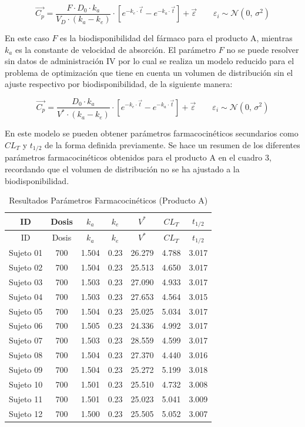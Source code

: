 \documentclass[]{article}
\begin{document}
\[\vec{C_{p}} = \frac{F \cdot D_{0} \cdot k_{a}}{V_{D} \cdot \left(k_{a}-k_{e}\right)}\cdot \left[e^{-k_{e}\cdot\vec{t} }- e^{-k_{a}\cdot\vec{t} } \right] + \vec{\varepsilon} \qquad \varepsilon_{i}\sim \mathcal{N}(0,\,\sigma^{2})\]

En este caso \(F\) es la biodisponibilidad del fármaco para el producto
A, mientras \(k_{a}\) es la constante de velocidad de absorción. El
parámetro \(F\) no se puede resolver sin datos de administración IV por
lo cual se realiza un modelo reducido para el problema de optimización
que tiene en cuenta un volumen de distribución sin el ajuste respectivo
por biodisponibilidad, de la siguiente manera:

\[\vec{C_{p}} = \frac{D_{0} \cdot k_{a}}{V^{*} \cdot \left(k_{a}-k_{e}\right)}\cdot \left[e^{-k_{e}\cdot\vec{t} }- e^{-k_{a}\cdot\vec{t} } \right] + \vec{\varepsilon} \qquad \varepsilon_{i}\sim \mathcal{N}(0,\,\sigma^{2})\]

En este modelo se pueden obtener parámetros farmacocinéticos secundarios
como \(CL_{T}\) y \(t_{1/2}\) de la forma definida previamente. Se hace
un resumen de los diferentes parámetros farmacocinéticos obtenidos para
el producto A en el cuadro 3, recordando que el volumen de distribución
no se ha ajustado a la biodisponibilidad.

\begin{longtable}[]{@{}ccccccc@{}}
\caption{Resultados Parámetros Farmacocinéticos (Producto
A)}\tabularnewline
\toprule
ID & Dosis & \(k_{a}\) & \(k_{e}\) & \(V^{*}\) & \(CL_{T}\) &
\(t_{1/2}\)\tabularnewline
\midrule
\endfirsthead
\toprule
ID & Dosis & \(k_{a}\) & \(k_{e}\) & \(V^{*}\) & \(CL_{T}\) &
\(t_{1/2}\)\tabularnewline
\midrule
\endhead
Sujeto 01 & 700 & 1.504 & 0.23 & 26.279 & 4.788 & 3.017\tabularnewline
Sujeto 02 & 700 & 1.504 & 0.23 & 25.513 & 4.650 & 3.017\tabularnewline
Sujeto 03 & 700 & 1.503 & 0.23 & 27.090 & 4.933 & 3.017\tabularnewline
Sujeto 04 & 700 & 1.503 & 0.23 & 27.653 & 4.564 & 3.015\tabularnewline
Sujeto 05 & 700 & 1.504 & 0.23 & 25.025 & 5.034 & 3.017\tabularnewline
Sujeto 06 & 700 & 1.505 & 0.23 & 24.336 & 4.992 & 3.017\tabularnewline
Sujeto 07 & 700 & 1.503 & 0.23 & 28.559 & 4.599 & 3.017\tabularnewline
Sujeto 08 & 700 & 1.504 & 0.23 & 27.370 & 4.440 & 3.016\tabularnewline
Sujeto 09 & 700 & 1.504 & 0.23 & 25.272 & 5.199 & 3.018\tabularnewline
Sujeto 10 & 700 & 1.501 & 0.23 & 25.510 & 4.732 & 3.008\tabularnewline
Sujeto 11 & 700 & 1.501 & 0.23 & 25.023 & 5.041 & 3.009\tabularnewline
Sujeto 12 & 700 & 1.500 & 0.23 & 25.505 & 5.052 & 3.007\tabularnewline
\bottomrule
\end{longtable}
\end{document}
